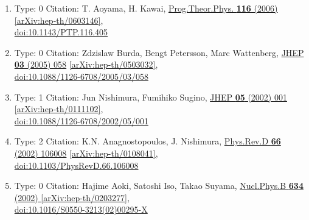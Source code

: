 \documentclass[a4paper,10pt]{article}
\begin{document}
\begin{enumerate}
\begin{enumerate}
  \item Type: 0 Citation: T. Aoyama, H. Kawai, \href{https://www.doi.org/10.1143/PTP.116.405}{Prog.Theor.Phys. {\bf 116} (2006) }  \href{https://arxiv.org/abs/hep-th/0603146}{[arXiv:hep-th/0603146]},\\\href{https://www.doi.org/10.1143/PTP.116.405}{doi:10.1143/PTP.116.405}
  \item Type: 0 Citation: Zdzislaw Burda, Bengt Petersson, Marc Wattenberg, \href{https://www.doi.org/10.1088/1126-6708/2005/03/058}{JHEP {\bf 03} (2005) 058}  \href{https://arxiv.org/abs/hep-th/0503032}{[arXiv:hep-th/0503032]},\\\href{https://www.doi.org/10.1088/1126-6708/2005/03/058}{doi:10.1088/1126-6708/2005/03/058}
  \item Type: 1 Citation: Jun Nishimura, Fumihiko Sugino, \href{https://www.doi.org/10.1088/1126-6708/2002/05/001}{JHEP {\bf 05} (2002) 001}  \href{https://arxiv.org/abs/hep-th/0111102}{[arXiv:hep-th/0111102]},\\\href{https://www.doi.org/10.1088/1126-6708/2002/05/001}{doi:10.1088/1126-6708/2002/05/001}
  \item Type: 2 Citation: K.N. Anagnostopoulos, J. Nishimura, \href{https://www.doi.org/10.1103/PhysRevD.66.106008}{Phys.Rev.D {\bf 66} (2002) 106008}  \href{https://arxiv.org/abs/hep-th/0108041}{[arXiv:hep-th/0108041]},\\\href{https://www.doi.org/10.1103/PhysRevD.66.106008}{doi:10.1103/PhysRevD.66.106008}
  \item Type: 0 Citation: Hajime Aoki, Satoshi Iso, Takao Suyama, \href{https://www.doi.org/10.1016/S0550-3213(02)00295-X}{Nucl.Phys.B {\bf 634} (2002) }  \href{https://arxiv.org/abs/hep-th/0203277}{[arXiv:hep-th/0203277]},\\\href{https://www.doi.org/10.1016/S0550-3213(02)00295-X}{doi:10.1016/S0550-3213(02)00295-X}

\end{enumerate}
\end{enumerate}
\end{document}
